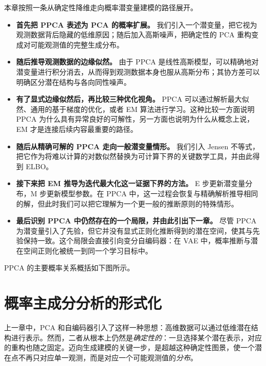 本章按照一条从确定性降维走向概率潜变量建模的路径展开。
\begin{itemize}

    \item[\(\rightarrow\)] \textbf{首先把 PPCA 表述为 PCA 的概率扩展。}  
    我们引入一个潜变量，把它视为观测数据背后隐藏的低维原因；随后加入高斯噪声，把确定性的 PCA 重构变成对可能观测值的完整生成分布。

    \item[\(\rightarrow\)] \textbf{随后推导观测数据的边缘似然。}  
    由于 PPCA 是线性高斯模型，可以精确地对潜变量进行积分消去，从而得到观测数据本身也服从高斯分布；其协方差可以明确区分潜在结构与各向同性噪声。

    \item[\(\rightarrow\)] \textbf{有了显式边缘似然后，再比较三种优化视角。}  
    PPCA 可以通过解析最大似然、通用的基于梯度的优化，或者 EM 算法进行学习。这种比较一方面说明 PPCA 为什么具有异常良好的可解性，另一方面也说明为什么从概念上说，EM 才是连接后续内容最重要的路径。

    \item[\(\rightarrow\)] \textbf{随后从精确可解的 PPCA 走向一般潜变量情形。}  
    我们引入 Jensen 不等式，把它作为将难以计算的对数似然替换为可计算下界的关键数学工具，并由此得到 ELBO。

    \item[\(\rightarrow\)] \textbf{接下来把 EM 推导为迭代最大化这一证据下界的方法。}  
    E 步更新潜变量分布，M 步更新模型参数。在 PPCA 中，这一过程会恢复与精确解析推导相同的解，但此时我们可以把它理解为一个更一般的推断原则的特殊情形。

    \item[\(\rightarrow\)] \textbf{最后识别 PPCA 中仍然存在的一个局限，并由此引出下一章。}  
    尽管 PPCA 为潜变量引入了先验，但它并没有显式正则化推断得到的潜在空间，使其与先验保持一致。这个局限会直接引向变分自编码器：在 VAE 中，概率推断与潜在空间正则化被统一到同一个学习目标中。

\end{itemize}

\medskip
\noindent PPCA 的主要概率关系概括如下图所示。

\medskip

\section{概率主成分分析的形式化}

上一章中，PCA 和自编码器引入了这样一种思想：高维数据可以通过低维潜在结构进行表示。然而，二者从根本上仍然是\emph{确定性的}：一旦选择某个潜在表示，对应的重构也随之固定。迈向生成建模的关键一步，是超越这种确定性图景，使一个潜在点不再只对应单一观测，而是对应一个可能观测值的\emph{分布}。

